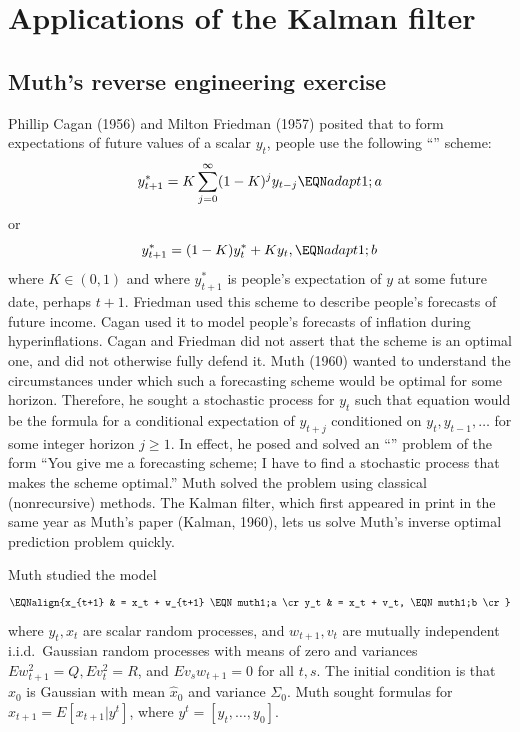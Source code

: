 \section{Applications  of the Kalman filter}\label{Kfilterapplications}%
\subsection{Muth's reverse engineering exercise}\label{sec:Muth_reverse}%
  Phillip Cagan  (1956) and Milton Friedman  (1957)
posited that to form
expectations of future values of a
scalar $y_t$, people use the following ``''
scheme:
$$ y_{t+1}^* = K \sum_{j=0}^\infty (1-K)^j y_{t-j} \EQN adapt1;a $$
or
$$ y_{t+1}^*  = (1-K) y_t^* + K y_t , \EQN adapt1;b$$
where $K \in (0,1)$ and where $y_{t+1}^*$ is people's expectation of $y$ at some future date, perhaps $t+1$.    Friedman
used this scheme to describe people's forecasts of future
income.  Cagan used it to model people's forecasts of inflation
during hyperinflations. Cagan and Friedman did not assert that
the scheme is an optimal one, and did not otherwise fully defend it.
Muth (1960) wanted to understand the circumstances under which
such a  forecasting  scheme  would be optimal for some horizon.  Therefore,
he sought a stochastic process for $y_t$ such that equation 
would be the formula for a conditional expectation of $y_{t+j}$ conditioned on $y_t, y_{t-1}, \ldots$
for some integer horizon $j \geq 1$.    In effect, he posed and solved an
``'' problem of the form  ``You give me
a forecasting scheme; I have to find a stochastic process
that makes the scheme optimal.''
Muth solved the problem using classical (nonrecursive) methods.
    The Kalman
filter, which  first appeared  in print in the same year as Muth's  paper (Kalman, 1960),  lets  us solve Muth's inverse optimal prediction
problem quickly.
%
%
%
%
%
%

Muth studied the model
$$\EQNalign{x_{t+1} & = x_t + w_{t+1} \EQN muth1;a \cr
            y_t & = x_t + v_t, \EQN muth1;b \cr}$$
where  $y_t, x_t$ are scalar random processes,
and $w_{t+1}, v_t$ are mutually independent
i.i.d.~Gaussian random processes with means of zero and
variances $E w_{t+1}^2 = Q, E v_t^2 =R$, and  $Ev_s w_{t+1} = 0$
for all $t,s$.  The initial condition
is that $x_0$ is Gaussian with mean $\hat x_0$ and
variance $\Sigma_0$. Muth sought formulas for
$\hat x_{t+1} = E [x_{t+1} \vert y^t]$, where
$y^t = [y_t, \ldots, y_0]$.


